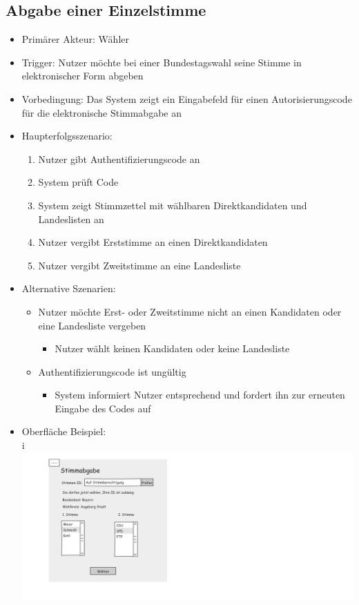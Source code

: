 \documentclass[a4paper]{scrreprt}
\begin{document}
\subsection{Abgabe einer Einzelstimme}
\begin{itemize}
\item Primärer Akteur: Wähler
\item Trigger: Nutzer möchte bei einer Bundestagswahl seine Stimme in elektronischer Form abgeben
\item Vorbedingung: Das System zeigt ein Eingabefeld für einen Autorisierungscode für die elektronische Stimmabgabe an
\item Haupterfolgsszenario:
\begin{enumerate}
\item Nutzer gibt Authentifizierungscode an
\item System prüft Code
\item System zeigt Stimmzettel mit wählbaren Direktkandidaten und Landeslisten an
\item Nutzer vergibt Erststimme an einen Direktkandidaten
\item Nutzer vergibt Zweitstimme an eine Landesliste
\end{enumerate}
\item Alternative Szenarien:
\begin{itemize}
\item Nutzer möchte Erst- oder Zweitstimme nicht an einen Kandidaten oder eine Landesliste vergeben
\begin{itemize}
\item Nutzer wählt keinen Kandidaten oder keine Landesliste
\end{itemize}
\item Authentifizierungscode ist ungültig
\begin{itemize}
\item System informiert Nutzer entsprechend und fordert ihn zur erneuten Eingabe des Codes auf
\end{itemize}
\end{itemize}
\item Oberfläche Beispiel: \\
i\includegraphics[width=\textwidth]{images/whlen.png}
\end{itemize}
 
\end{document}
